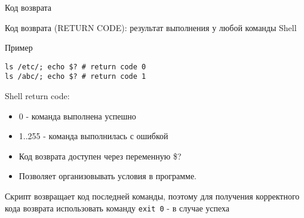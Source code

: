 \begin{frame}[fragile]{Код возврата}

  \Large{\alert{Код возврата (RETURN CODE)}}: \newline 
  \normalsize{результат выполнения у любой команды Shell}
  \newline
	\begin{block}{Пример}
		\begin{lstlisting}
ls /etc/; echo $? # return code 0
ls /abc/; echo $? # return code 1
		\end{lstlisting}
	\end{block}

	\pause
  Shell return code:
  \begin{itemize}
    \item \alert{0} - команда выполнена успешно
    \item \alert{1..255} - команда выполнилась с ошибкой
    \item Код возврата доступен через переменную \alert{\$?}
    \item Позволяет организовывать условия в программе.
  \end{itemize}

	Скрипт возвращает код последней команды, поэтому для получения корректного кода возврата использовать команду {\tt exit 0} - в случае успеха

\end{frame}
